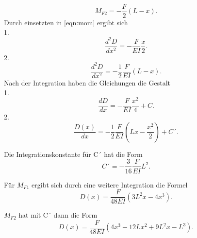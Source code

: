 \begin{equation*}
  M_{F2} = -\frac{F}{2}(L-x).
  \label{eqn:mf2}
\end{equation*}
Durch einsetzten in \eqref{eqn:mom} ergibt sich\\
1.
\begin{equation*}
  \frac{d^2D}{dx^2} = -\frac{F}{EI}\frac{x}{2}.
  \label{eqn:inmom1}
\end{equation*}
2.
\begin{equation*}
  \frac{d^2D}{dx^2} = -\frac{1}{2}\frac{F}{EI}(L-x).
  \label{eqn:inmom2}
\end{equation*}
Nach der Integration haben die Gleichungen die Gestalt\\
1.
\begin{equation*}
  \frac{dD}{dx} = -\frac{F}{EI}\frac{x^2}{4}+C.
  \label{eqn:intmom1}
\end{equation*}
2.
\begin{equation*}
  \frac{D(x)}{dx} = -\frac{1}{2}\frac{F}{EI}(Lx-\frac{x^2}{2})+C´.
  \label{eqn:intmom2}
\end{equation*}

Die Integrationskonstante für C´ hat die Form
\begin{equation*}
  C´  =-\frac{3}{16}\frac{F}{EI}L^2.
  \label{eqn:C`}
\end{equation*}

Für $M_{F1}$ ergibt sich durch eine weitere Integration die Formel
\begin{equation}
  D(x) = \frac{F}{48EI}(3L^2x-4x^3).
  \label{eqn:D(x)1}
\end{equation}

$M_{F2}$ hat mit C´ dann die Form
\begin{equation}
  D(x) = \frac{F}{48EI}(4x^3-12Lx^2+9L^2x-L^3).
  \label{eqn:D(x)2}
\end{equation}

%
%
%
%
